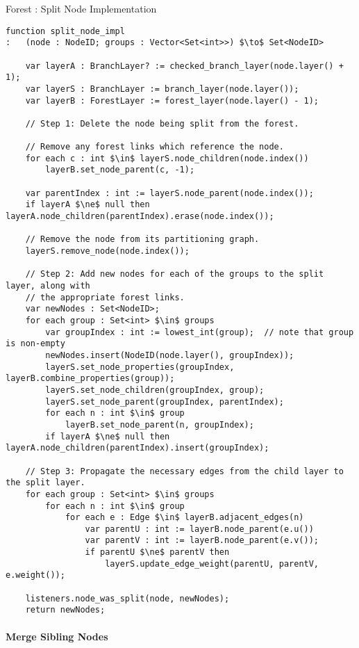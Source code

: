 \begin{stulisting}[p]
\caption{Forest : Split Node Implementation}
\label{code:ipfs-forest-splitnodeimpl}
\begin{lstlisting}[style=Default]
function split_node_impl
:	(node : NodeID; groups : Vector<Set<int>>) $\to$ Set<NodeID>

	var layerA : BranchLayer? := checked_branch_layer(node.layer() + 1);
	var layerS : BranchLayer := branch_layer(node.layer());
	var layerB : ForestLayer := forest_layer(node.layer() - 1);

	// Step 1: Delete the node being split from the forest.

	// Remove any forest links which reference the node.
	for each c : int $\in$ layerS.node_children(node.index())
		layerB.set_node_parent(c, -1);

	var parentIndex : int := layerS.node_parent(node.index());
	if layerA $\ne$ null then layerA.node_children(parentIndex).erase(node.index());

	// Remove the node from its partitioning graph.
	layerS.remove_node(node.index());

	// Step 2: Add new nodes for each of the groups to the split layer, along with
	// the appropriate forest links.
	var newNodes : Set<NodeID>;
	for each group : Set<int> $\in$ groups
		var groupIndex : int := lowest_int(group);	// note that group is non-empty
		newNodes.insert(NodeID(node.layer(), groupIndex));
		layerS.set_node_properties(groupIndex, layerB.combine_properties(group));
		layerS.set_node_children(groupIndex, group);
		layerS.set_node_parent(groupIndex, parentIndex);
		for each n : int $\in$ group
			layerB.set_node_parent(n, groupIndex);
		if layerA $\ne$ null then layerA.node_children(parentIndex).insert(groupIndex);

	// Step 3: Propagate the necessary edges from the child layer to the split layer.
	for each group : Set<int> $\in$ groups
		for each n : int $\in$ group
			for each e : Edge $\in$ layerB.adjacent_edges(n)
				var parentU : int := layerB.node_parent(e.u())
				var parentV : int := layerB.node_parent(e.v());
				if parentU $\ne$ parentV then
					layerS.update_edge_weight(parentU, parentV, e.weight());

	listeners.node_was_split(node, newNodes);
	return newNodes;
\end{lstlisting}
\end{stulisting}

\paragraph{Merge Sibling Nodes}

